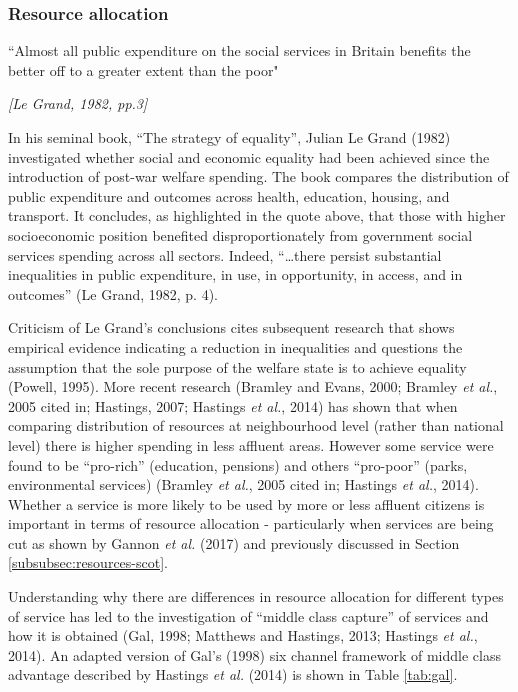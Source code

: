 \documentclass[12pt,a4paper,oneside,table]{report}
\begin{document}
\subsubsection{Resource allocation}\label{subsubsec:theory-resources}

\epigraph{``Almost all public expenditure on the social services in Britain benefits the better off to a greater extent than the poor"}{\textit{[Le Grand, 1982, pp.3]}}

In his seminal book, ``The strategy of equality'', Julian Le Grand
(1982) investigated whether social and economic equality had been
achieved since the introduction of post-war welfare spending. The book
compares the distribution of public expenditure and outcomes across
health, education, housing, and transport. It concludes, as highlighted
in the quote above, that those with higher socioeconomic position
benefited disproportionately from government social services spending
across all sectors. Indeed, ``\ldots there persist substantial
inequalities in public expenditure, in use, in opportunity, in access,
and in outcomes'' (Le Grand, 1982, p. 4).

Criticism of Le Grand's conclusions cites subsequent research that shows
empirical evidence indicating a reduction in inequalities and questions
the assumption that the sole purpose of the welfare state is to achieve
equality (Powell, 1995). More recent research (Bramley and Evans, 2000;
Bramley \emph{et al.}, 2005 cited in; Hastings, 2007; Hastings \emph{et
al.}, 2014) has shown that when comparing distribution of resources at
neighbourhood level (rather than national level) there is higher
spending in less affluent areas. However some service were found to be
``pro-rich'' (education, pensions) and others ``pro-poor'' (parks,
environmental services) (Bramley \emph{et al.}, 2005 cited in; Hastings
\emph{et al.}, 2014). Whether a service is more likely to be used by
more or less affluent citizens is important in terms of resource
allocation - particularly when services are being cut as shown by Gannon
\textit{et al.} (2017) and previously discussed in Section
\ref{subsubsec:resources-scot}.

Understanding why there are differences in resource allocation for
different types of service has led to the investigation of ``middle
class capture'' of services and how it is obtained (Gal, 1998; Matthews
and Hastings, 2013; Hastings \emph{et al.}, 2014). An adapted version of
Gal's (1998) six channel framework of middle class advantage described
by Hastings \emph{et al.} (2014) is shown in Table \ref{tab:gal}.
\end{document}
